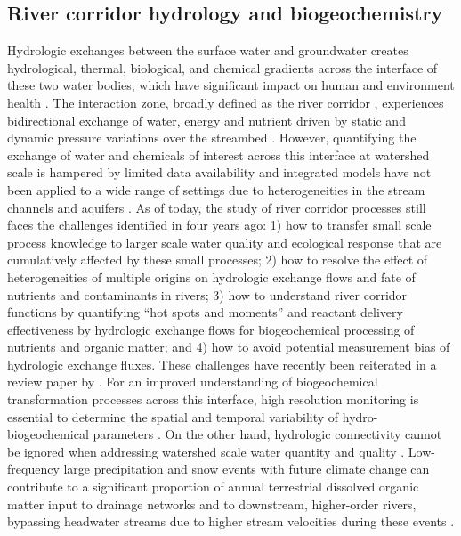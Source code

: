 \documentclass[preprint,review, 12pt]{elsarticle}
\begin{document}
\subsection{River corridor hydrology and biogeochemistry}

Hydrologic exchanges between the surface water and groundwater creates hydrological, thermal, biological, and chemical gradients across the interface of these two water bodies, which have significant impact on human and environment health \citep{Bobba2012,Conant2019}. The interaction zone, broadly defined as the river corridor \citep{Harvey2015b}, experiences bidirectional exchange of water, energy and nutrient driven by static and dynamic pressure variations over the streambed \citep{Grant2018}. However, quantifying the exchange of water and chemicals of interest across this interface at watershed scale is hampered by limited data availability and integrated models have not been applied to a wide range of settings due to heterogeneities in the stream channels and aquifers \citep{Barthel2016}. As of today, the study of river corridor processes still faces the challenges identified in \cite{Harvey2015b} four years ago: 1) how to transfer small scale process knowledge to larger scale water quality and ecological response that are cumulatively affected by these small processes; 2) how to resolve the effect of heterogeneities of multiple origins on hydrologic exchange flows and fate of nutrients and contaminants in rivers; 3) how to understand river corridor functions by quantifying “hot spots and moments” and reactant delivery effectiveness by hydrologic exchange flows for biogeochemical processing of nutrients and organic matter; and 4) how to avoid potential measurement bias of hydrologic exchange fluxes.  These challenges have recently been reiterated in a review paper by \cite{ward2019}. For an improved understanding of biogeochemical transformation processes across this interface, high resolution monitoring is essential to determine the spatial and temporal variability of hydro-biogeochemical parameters \citep{Gassen2017}. On the other hand, hydrologic connectivity cannot be ignored when addressing watershed scale water quantity and quality \citep{Freeman2007,harvey2019connectivity}.  Low-frequency large precipitation and snow events with future climate change can contribute to a significant proportion of annual terrestrial dissolved organic matter input to drainage networks and to downstream, higher-order rivers, bypassing headwater streams due to higher stream velocities during these events \citep{Raymond2016}.
\end{document}
